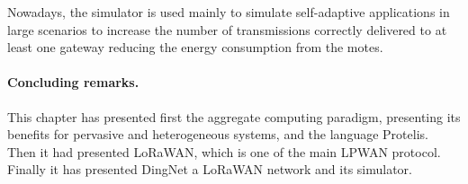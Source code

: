 Nowadays, the simulator is used mainly to simulate self-adaptive applications in large scenarios to increase the number of transmissions correctly delivered to at least one gateway reducing the energy consumption from the motes.

\paragraph{Concluding remarks.} This chapter has presented first the aggregate computing paradigm, presenting its benefits for pervasive and heterogeneous systems, and the language Protelis. Then it had presented LoRaWAN, which is one of the main LPWAN protocol. 
Finally it has presented DingNet a LoRaWAN network and its simulator.
